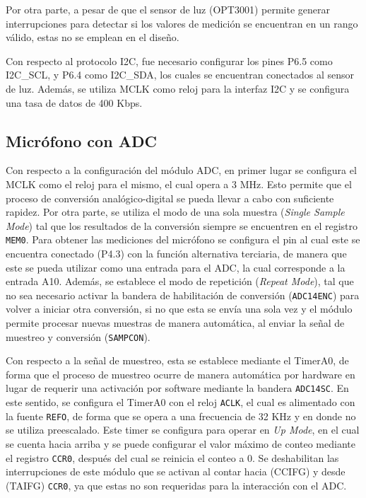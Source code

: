 Por otra parte, a pesar de que el sensor de luz (OPT3001) permite generar interrupciones para
detectar si los valores de medición se encuentran en un rango válido, estas no se emplean en el diseño.

Con respecto al protocolo I2C, fue necesario configurar los pines P6.5 como I2C\_SCL, y P6.4 como
I2C\_SDA, los cuales se encuentran conectados al sensor de luz. Además, se utiliza MCLK como reloj
para la interfaz I2C y se configura una tasa de datos de 400 Kbps.  

\subsection{Micrófono con ADC}
Con respecto a la configuración del módulo ADC, en primer lugar se configura el MCLK como el reloj
para el mismo, el cual opera a 3 MHz. Esto permite que el proceso de conversión analógico-digital se
pueda llevar a cabo con suficiente rapidez. Por otra parte, se utiliza el modo de una sola muestra
(\textit{Single Sample Mode}) tal que los resultados de la conversión siempre se encuentren en el
registro \texttt{MEM0}. Para obtener las mediciones del micrófono se configura el pin al cual este
se encuentra conectado (P4.3) con la función alternativa terciaria, de manera que este se pueda
utilizar como una entrada para el ADC, la cual corresponde a la entrada A10. Además, se establece el
modo de repetición (\textit{Repeat Mode}), tal que no sea necesario activar la bandera de
habilitación de conversión (\texttt{ADC14ENC}) para volver a iniciar otra conversión, si no que esta
se envía una sola vez y el módulo permite procesar nuevas muestras de manera automática, al enviar la
señal de muestreo y conversión (\texttt{SAMPCON}).

Con respecto a la señal de muestreo, esta se establece mediante el TimerA0, de forma que el proceso
de muestreo ocurre de manera automática por hardware en lugar de requerir una activación por
software mediante la bandera \texttt{ADC14SC}. En este sentido, se configura el TimerA0 con el reloj
\texttt{ACLK}, el cual es alimentado con la fuente \texttt{REFO}, de forma que se opera a una
frecuencia de 32 KHz y en donde no se utiliza preescalado. Este timer se configura para operar en
\textit{Up Mode}, en el cual se cuenta hacia arriba y se puede configurar el valor máximo de conteo
mediante el registro \texttt{CCR0}, después del cual se reinicia el conteo a 0. Se deshabilitan las
interrupciones de este módulo que se activan al contar hacia (CCIFG) y desde (TAIFG) \texttt{CCR0},
ya que estas no son requeridas para la interacción con el ADC. 

